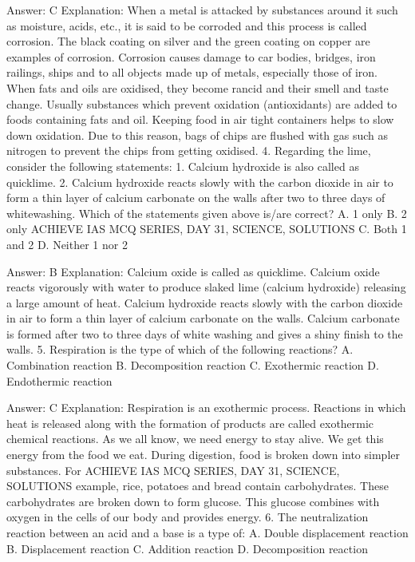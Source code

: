 Answer: C
Explanation: When a metal is attacked by substances around it such as moisture, acids, etc., it is said to be corroded and this process is called corrosion. The black coating on silver and the green coating on copper are examples of corrosion. Corrosion causes damage to car bodies, bridges, iron railings, ships and to all objects made up of metals, especially those of iron. When fats and oils are oxidised, they become rancid and their smell and taste change. Usually substances which prevent oxidation (antioxidants) are added to foods containing fats and oil. Keeping food in air tight containers helps to slow down oxidation. Due to this reason, bags of chips are flushed with gas such as nitrogen to prevent the chips from getting oxidised. 4. Regarding the lime, consider the following statements: 1. Calcium hydroxide is also called as quicklime. 2. Calcium hydroxide reacts slowly with the carbon dioxide in air to form a thin layer of calcium carbonate on the walls after two to three days of whitewashing. Which of the statements given above is/are correct? A. 1 only B. 2 only ACHIEVE IAS MCQ SERIES, DAY 31, SCIENCE, SOLUTIONS C. Both 1 and 2 D. Neither 1 nor 2 

Answer: B
Explanation: Calcium oxide is called as quicklime. Calcium oxide reacts vigorously with water to produce slaked lime (calcium hydroxide) releasing a large amount of heat. Calcium hydroxide reacts slowly with the carbon dioxide in air to form a thin layer of calcium carbonate on the walls. Calcium carbonate is formed after two to three days of white washing and gives a shiny finish to the walls. 5. Respiration is the type of which of the following reactions? A. Combination reaction B. Decomposition reaction C. Exothermic reaction D. Endothermic reaction 

Answer: C
Explanation: Respiration is an exothermic process. Reactions in which heat is released along with the formation of products are called exothermic chemical reactions. As we all know, we need energy to stay alive. We get this energy from the food we eat. During digestion, food is broken down into simpler substances. For ACHIEVE IAS MCQ SERIES, DAY 31, SCIENCE, SOLUTIONS example, rice, potatoes and bread contain carbohydrates. These carbohydrates are broken down to form glucose. This glucose combines with oxygen in the cells of our body and provides energy. 6. The neutralization reaction between an acid and a base is a type of: A. Double displacement reaction B. Displacement reaction C. Addition reaction D. Decomposition reaction 

